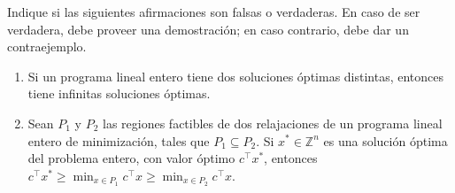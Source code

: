 Indique si las siguientes afirmaciones son falsas o verdaderas. En caso de ser verdadera, debe proveer una demostración; en caso contrario, debe dar un contraejemplo.  
\begin{enumerate}
\item Si un programa lineal entero tiene dos soluciones óptimas distintas, entonces tiene infinitas soluciones óptimas. 
\item Sean $P_1$ y $P_2$ las regiones factibles de dos relajaciones de un programa lineal entero de minimización, tales que $P_1 \subseteq P_2$. Si $x^* \in \mathbb{Z}^n$ es una solución óptima del problema entero, con valor óptimo $c^\top x^*$, entonces
$c^\top x^* \geq \min_{x \in P_1} c^\top x \geq \min_{x \in P_2} c^\top x$.
\end{enumerate}
